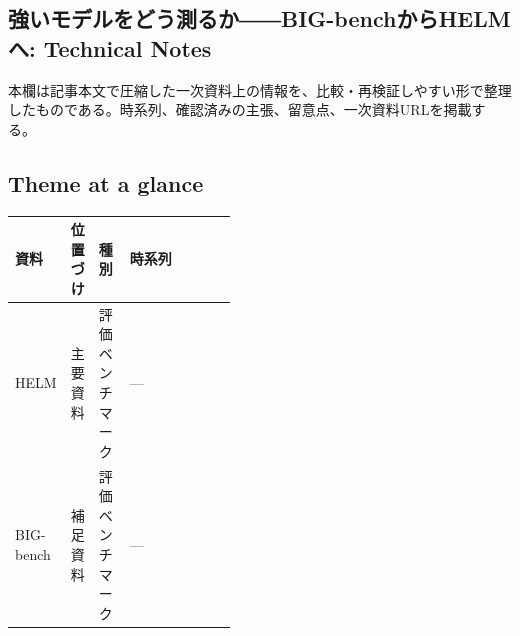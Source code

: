 \subsection*{強いモデルをどう測るか――BIG-benchからHELMへ: Technical Notes}
本欄は記事本文で圧縮した一次資料上の情報を、比較・再検証しやすい形で整理したものである。時系列、確認済みの主張、留意点、一次資料URLを掲載する。
\smallskip
{}\par
\medskip
\subsection*{Theme at a glance}
\begin{center}
\footnotesize
\begin{tabularx}{\linewidth}{@{}p{0.20\linewidth}p{0.10\linewidth}p{0.14\linewidth}X@{}}
\toprule
資料 & 位置づけ & 種別 & 時系列 \\
\midrule
HELM & 主要資料 & 評価ベンチマーク & — \\
BIG-bench & 補足資料 & 評価ベンチマーク & — \\
\bottomrule
\end{tabularx}
\end{center}
\normalsize

